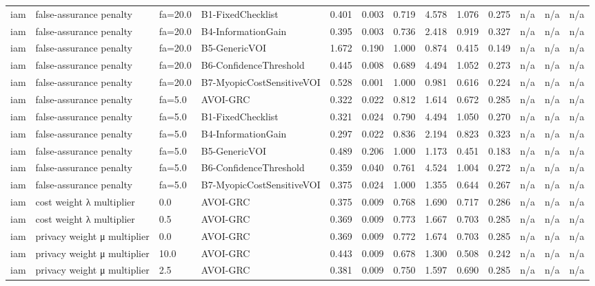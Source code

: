 \begin{table}[!ht]
{\begin{tabular}{lllllllllllll}
iam & false-assurance penalty & fa=20.0 & B1-FixedChecklist & 0.401 & 0.003 & 0.719 & 4.578 & 1.076 & 0.275 & n/a & n/a & n/a \\
iam & false-assurance penalty & fa=20.0 & B4-InformationGain & 0.395 & 0.003 & 0.736 & 2.418 & 0.919 & 0.327 & n/a & n/a & n/a \\
iam & false-assurance penalty & fa=20.0 & B5-GenericVOI & 1.672 & 0.190 & 1.000 & 0.874 & 0.415 & 0.149 & n/a & n/a & n/a \\
iam & false-assurance penalty & fa=20.0 & B6-ConfidenceThreshold & 0.445 & 0.008 & 0.689 & 4.494 & 1.052 & 0.273 & n/a & n/a & n/a \\
iam & false-assurance penalty & fa=20.0 & B7-MyopicCostSensitiveVOI & 0.528 & 0.001 & 1.000 & 0.981 & 0.616 & 0.224 & n/a & n/a & n/a \\
iam & false-assurance penalty & fa=5.0 & AVOI-GRC & 0.322 & 0.022 & 0.812 & 1.614 & 0.672 & 0.285 & n/a & n/a & n/a \\
iam & false-assurance penalty & fa=5.0 & B1-FixedChecklist & 0.321 & 0.024 & 0.790 & 4.494 & 1.050 & 0.270 & n/a & n/a & n/a \\
iam & false-assurance penalty & fa=5.0 & B4-InformationGain & 0.297 & 0.022 & 0.836 & 2.194 & 0.823 & 0.323 & n/a & n/a & n/a \\
iam & false-assurance penalty & fa=5.0 & B5-GenericVOI & 0.489 & 0.206 & 1.000 & 1.173 & 0.451 & 0.183 & n/a & n/a & n/a \\
iam & false-assurance penalty & fa=5.0 & B6-ConfidenceThreshold & 0.359 & 0.040 & 0.761 & 4.524 & 1.004 & 0.272 & n/a & n/a & n/a \\
iam & false-assurance penalty & fa=5.0 & B7-MyopicCostSensitiveVOI & 0.375 & 0.024 & 1.000 & 1.355 & 0.644 & 0.267 & n/a & n/a & n/a \\
iam & cost weight λ multiplier & 0.0 & AVOI-GRC & 0.375 & 0.009 & 0.768 & 1.690 & 0.717 & 0.286 & n/a & n/a & n/a \\
iam & cost weight λ multiplier & 0.5 & AVOI-GRC & 0.369 & 0.009 & 0.773 & 1.667 & 0.703 & 0.285 & n/a & n/a & n/a \\
iam & privacy weight μ multiplier & 0.0 & AVOI-GRC & 0.369 & 0.009 & 0.772 & 1.674 & 0.703 & 0.285 & n/a & n/a & n/a \\
iam & privacy weight μ multiplier & 10.0 & AVOI-GRC & 0.443 & 0.009 & 0.678 & 1.300 & 0.508 & 0.242 & n/a & n/a & n/a \\
iam & privacy weight μ multiplier & 2.5 & AVOI-GRC & 0.381 & 0.009 & 0.750 & 1.597 & 0.690 & 0.285 & n/a & n/a & n/a \\

\end{tabular}}
\end{table}

